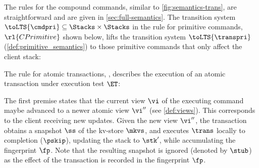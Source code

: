 The rules for the compound commands, similar to \cref{fig:semantics-trans}, are straightforward and are given in \cref{sec:full-semantics}.
The transition system $\toLTS{\cmdpri} \subseteq \Stacks \times \Stacks$ in the rule for primitive commands, $\rl{CPrimitive}$ shown below, 
lifts the transition system $\toLTS{\transpri}$ (\cref{def:primitive_semantics}) to those primitive commands that only affect the client stack:
The rule for atomic transactions, , describes the execution of an atomic 
transaction under execution test $\ET$:
\begin{mathpar}
\end{mathpar}
The first premise
states that the current view $\vi$ of the executing command maybe advanced to a newer atomic view $\vi''$ (see \cref{def:views}). 
This corresponds to the client receiving new updates.
Given the new view $\vi''$, the transaction obtains a snapshot $\ss$ of the kv-store $\mkvs$, 
and executes $\trans$ locally to completion ($\pskip$), updating the stack to $\stk'$, while accumulating the fingerprint $\fp$. 
Note that the resulting snapshot is ignored (denoted by $\stub$) as the effect of the transaction is recorded in the fingerprint $\fp$. 

